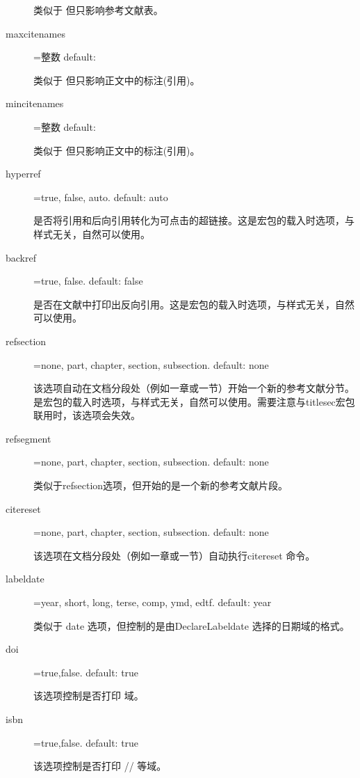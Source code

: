 \begin{description}
  类似于   但只影响参考文献表。

  \item[maxcitenames]=整数 \hfill default: 

  类似于  但只影响正文中的标注(引用)。

  \item[mincitenames]=整数 \hfill default: 

  类似于  但只影响正文中的标注(引用)。

  \item[hyperref]=true, false, auto. \hfill default: auto

  是否将引用和后向引用转化为可点击的超链接。这是宏包的载入时选项，与样式无关，自然可以使用。

  \item[backref]=true, false. \hfill default: false

  是否在文献中打印出反向引用。这是宏包的载入时选项，与样式无关，自然可以使用。

  \item[refsection]=none, part, chapter, section, subsection. \hfill default: none

  该选项自动在文档分段处（例如一章或一节）开始一个新的参考文献分节。是宏包的载入时选项，与样式无关，自然可以使用。需要注意与titlesec宏包联用时，该选项会失效。

  \item[refsegment]=none, part, chapter, section, subsection. \hfill default: none

  类似于refsection选项，但开始的是一个新的参考文献片段。

  \item[citereset]=none, part, chapter, section, subsection. \hfill default: none

  该选项在文档分段处（例如一章或一节）自动执行citereset 命令。

  \item[labeldate]=year, short, long, terse, comp, ymd, edtf. \hfill default: year

  类似于 date 选项，但控制的是由DeclareLabeldate 选择的日期域的格式。

  \item[doi]=true,false. \hfill default: true

  该选项控制是否打印  域。

  \item[isbn]=true,false. \hfill default: true

  该选项控制是否打印 \slash {}\slash {} 等域。


\end{description}
